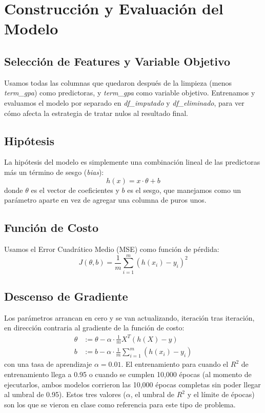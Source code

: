 \documentclass[10pt,twocolumn]{article}
\begin{document}
\section{Construcción y Evaluación del Modelo}

\subsection{Selección de Features y Variable Objetivo}

Usamos todas las columnas que quedaron después de la limpieza (menos \textit{term\_gpa}) como predictoras, y \textit{term\_gpa} como variable objetivo. Entrenamos y evaluamos el modelo por separado en \textit{df\_imputado} y \textit{df\_eliminado}, para ver cómo afecta la estrategia de tratar nulos al resultado final.

\subsection{Hipótesis}

La hipótesis del modelo es simplemente una combinación lineal de las predictoras más un término de sesgo (\textit{bias}):
\begin{equation}
h(x) = x \cdot \theta + b
\end{equation}
donde $\theta$ es el vector de coeficientes y $b$ es el sesgo, que manejamos como un parámetro aparte en vez de agregar una columna de puros unos.

\subsection{Función de Costo}

Usamos el Error Cuadrático Medio (MSE) como función de pérdida:
\begin{equation}
J(\theta, b) = \frac{1}{m}\sum_{i=1}^{m}\left(h(x_i) - y_i\right)^2
\end{equation}

\subsection{Descenso de Gradiente}

Los parámetros arrancan en cero y se van actualizando, iteración tras iteración, en dirección contraria al gradiente de la función de costo:
\begin{align}
\theta &:= \theta - \alpha \cdot \frac{1}{m} X^T (h(X) - y) \\
b &:= b - \alpha \cdot \frac{1}{m} \sum_{i=1}^{m} (h(x_i) - y_i)
\end{align}
con una tasa de aprendizaje $\alpha = 0.01$. El entrenamiento para cuando el $R^2$ de entrenamiento llega a 0.95 o cuando se cumplen 10,000 épocas (al momento de ejecutarlos, ambos modelos corrieron las 10,000 épocas completas sin poder llegar al umbral de 0.95). Estos tres valores ($\alpha$, el umbral de $R^2$ y el límite de épocas) son los que se vieron en clase como referencia para este tipo de problema.
\end{document}
